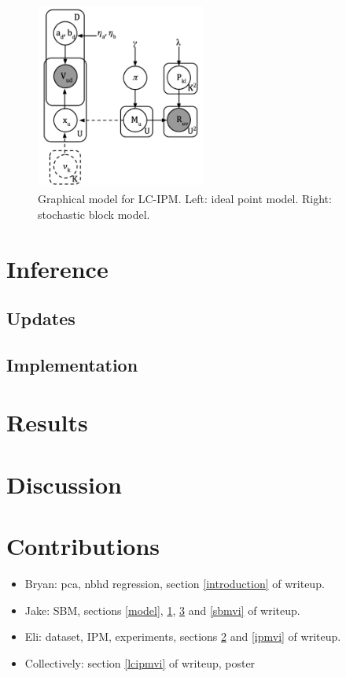 \documentclass{article}
\begin{document}
\begin{figure}[h]
  \centering
        \includegraphics[width=15em]{lcipm2.png}
  \caption{Graphical model for LC-IPM. Left: ideal point model. Right: stochastic block model.}
      \label{fig:pgm}
\end{figure}



\newpage

\section{Inference}
\label{inference}

\subsection{Updates}



\subsection{Implementation}

\newpage

\section{Results}
\label{results}

\section{Discussion}
\label{discussion}

\section{Contributions}
\begin{itemize}
\item Bryan: pca, nbhd regression, section \ref{introduction} of writeup.
\item Jake: SBM, sections \ref{model}, \ref{inference}, \ref{discussion} and \ref{sbmvi} of writeup.
\item Eli: dataset, IPM, experiments, sections \ref{results} and \ref{ipmvi} of writeup.
\item Collectively: section \ref{lcipmvi} of writeup, poster
\end{itemize}
\end{document}
